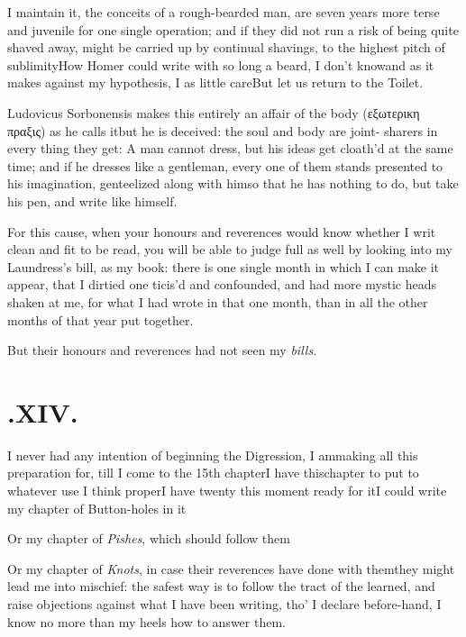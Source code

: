 \documentclass{article}
\begin{document}
\tsh I maintain it, the conceits of a rough-bearded
man, are seven years more terse and juvenile for one single
operation; and if they did not run a risk of being quite shaved
away, might be carried up by continual shavings, to the highest
pitch of sublimity\tsk How Homer could write with so long
a beard, I don’t know\tsh and as it makes against my
hypothesis, I as little care\tsh But let us return to the
Toilet.

Ludovicus Sorbonensis makes this entirely an affair of the body (εξωτερικη πραξις)
as he calls it\tsh but he is deceived: the soul and body are joint- sharers in
every thing they get: A man cannot dress, but his ideas get cloath’d at the same
time; and if he dresses like a gentleman, every one of them stands presented to his
imagination, genteelized along with him\tsk so that he has nothing to do, but take his
pen, and write like himself.

For this cause, when your honours and reverences would know whether I writ clean and
fit to be read, you will be able to judge full as well by looking into my
Laundress’s bill, as my book: there is one single month in which I can make it
appear, that I dirtied one 
ticis’d and confounded, and had more mystic heads shaken at
me, for what I had wrote in that one month, than in all the other months of that
year put together.

\tsh But their honours and reverences had not seen my \textit{bills}.

\vfill{}\eject
\null{}\baselineskip
\section{.\enspace XIV.}

 I never had any intention of
beginning the Digression, I am\break making all this preparation for,
till I come to the 15th chapter\tsh I have this\break chapter to
put to whatever use I think proper\tsh I have twenty this
moment ready for it\tsh I could write my chapter of
Button-holes in it\tsh

Or my chapter of \textit{Pishes}, which should follow
them\tsh

Or my chapter of \textit{Knots}, in case their reverences have
done with them\tsh\break they might lead me into mischief: the
safest way is to follow the tract of the learned, and raise
objections against what I have been writing, tho’ I declare
before-hand, I know no more than my heels how to answer them.
\end{document}
